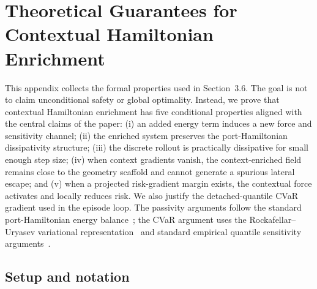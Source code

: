 
%   
%
%

\section{Theoretical Guarantees for Contextual Hamiltonian Enrichment}
\label{app:theory}

This appendix collects the formal properties used in Section~3.6.
The goal is not to claim unconditional safety or global optimality. Instead, we prove
that contextual Hamiltonian enrichment has five conditional properties aligned with
the central claims of the paper: (i) an added energy term induces a new force and
sensitivity channel; (ii) the enriched system preserves the port-Hamiltonian
dissipativity structure; (iii) the discrete rollout is practically dissipative for small
enough step size; (iv) when context gradients vanish, the context-enriched field remains close to the
geometry scaffold and cannot generate a spurious lateral escape; and (v) when a
projected risk-gradient margin exists, the contextual force activates and locally
reduces risk. We also justify the detached-quantile CVaR gradient used in the
episode loop. The passivity arguments follow the standard port-Hamiltonian energy
balance~\citep{vanDerSchaftJeltsema2014,Desai2021PortHNN}; the CVaR argument
uses the Rockafellar--Uryasev variational representation~\citep{RockafellarUryasev2000}
and standard empirical quantile sensitivity arguments~\citep{HongHuLiu2014}.





\subsection{Setup and notation}
\label{app:setup}

